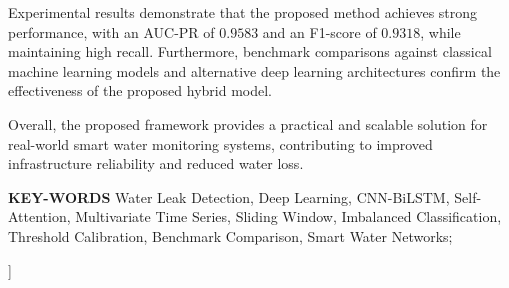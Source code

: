 {\begin{leftbar}
Experimental results demonstrate that the proposed method achieves strong
performance, with an AUC-PR of $0.9583$ and an F1-score of $0.9318$, while
maintaining high recall. Furthermore, benchmark comparisons against classical
machine learning models and alternative deep learning architectures confirm
the effectiveness of the proposed hybrid model.

Overall, the proposed framework provides a practical and scalable solution for
real-world smart water monitoring systems, contributing to improved infrastructure
reliability and reduced water loss.
\end{leftbar}

\vspace{1em}

\begin{leftbar}
\textbf{\textcolor{headingblue}{KEY-WORDS}} Water Leak Detection, Deep Learning,
CNN-BiLSTM, Self-Attention, Multivariate Time Series, Sliding Window,
Imbalanced Classification, Threshold Calibration, Benchmark Comparison,
Smart Water Networks;
\end{leftbar}

\vspace{2.5em}
}]